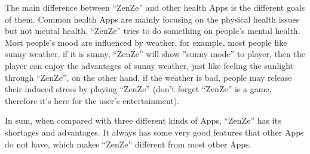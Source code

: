 \documentclass{sigchi}
\begin{document}
The main difference between ``ZenZe'' and other health Apps is the different goals of them. Common health Apps are mainly focusing on the physical health issues but not mental health. ``ZenZe'' tries to do something on people's mental health. Most people's mood are influenced by weather, for example, most people like sunny weather, if it is sunny, ``ZenZe'' will show ''sunny mode'' to player, then the player can enjoy the advantages of sunny weather, just like feeling the sunlight through ``ZenZe'', on the other hand, if the weather is bad, people may release their induced stress by playing ``ZenZe'' (don't forget ``ZenZe'' is a game, therefore it's here for the user's entertainment).

In sum, when compared with three different kinds of Apps, ``ZenZe'' has its shortages and advantages. It always has some very good  features that other Apps do not have, which makes ``ZenZe'' different from most other Apps. 
\end{document}
